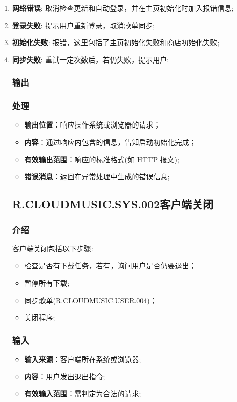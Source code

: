 \begin{enumerate}
\item \textbf{网络错误}: 取消检查更新和自动登录，并在主页初始化时加入报错信息;
\item \textbf{登录失败}: 提示用户重新登录，取消歌单同步;
\item \textbf{初始化失败}: 报错，这里包括了主页初始化失败和商店初始化失败;
  \item \textbf{同步失败}: 重试一定次数后，若仍失败，提示用户;
\subsubsection{输出}
\subsubsection{处理}
\begin{itemize}
	\item \textbf{输出位置}：响应操作系统或浏览器的请求；
	\item \textbf{内容}：通过响应内包含的信息，告知启动初始化完成；
	\item \textbf{有效输出范围}：响应的标准格式(如 HTTP 报文);
	\item \textbf{错误消息}：返回在异常处理中生成的错误信息;
\end{itemize}

\subsection{R.CLOUDMUSIC.SYS.002客户端关闭}
\subsubsection{介绍}
客户端关闭包括以下步骤:
	\begin{itemize}
		\item 检查是否有下载任务，若有，询问用户是否仍要退出；
		\item 暂停所有下载;
		\item 同步歌单(R.CLOUDMUSIC.USER.004)；
		\item 关闭程序;
	\end{itemize}
\subsubsection{输入}
	\begin{itemize}
		\item \textbf{输入来源}：客户端所在系统或浏览器;
		\item \textbf{内容}：用户发出退出指令;
		\item \textbf{有效输入范围}：需判定为合法的请求;
	\end{itemize}

\end{enumerate}
